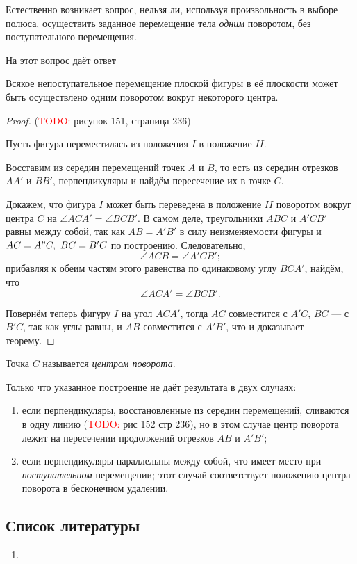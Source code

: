 Естественно возникает вопрос, нельзя ли, используя произвольность в выборе
полюса, осуществить заданное перемещение тела \textit{одним} поворотом, без
поступательного перемещения.

На этот вопрос даёт ответ
\begin{theorem}[Эйлера]
  Всякое непоступательное перемещение плоской фигуры в её плоскости может быть
  осуществлено одним поворотом вокруг некоторого центра.
\end{theorem}

\begin{proof}
  (\textcolor{red}{TODO:} рисунок 151, страница 236)

  Пусть фигура переместилась из положения $I$ в положение $II$.

  Восставим из середин перемещений точек $A$ и $B$, то есть из середин отрезков
  $AA'$ и $BB'$, перпендикуляры и найдём пересечение их в точке $C$.

  Докажем, что фигура $I$ может быть переведена в положение $II$ поворотом
  вокруг центра $C$ на $\angle ACA' = \angle BCB'$. В самом деле, треугольники
  $ABC$ и $A'CB'$ равны между собой, так как $AB = A'B'$ в силу неизменяемости
  фигуры и $AC = A"C,~BC = B'C$ по построению. Следовательно,
  \begin{equation*}
    \angle ACB = \angle A'CB';
  \end{equation*}
  прибавляя к обеим частям этого равенства по одинаковому углу $BCA'$, найдём,
  что
  \begin{equation*}
    \angle ACA' = \angle BCB'.
  \end{equation*}

  Повернём теперь фигуру $I$ на угол $ACA'$, тогда $AC$ совместится с $A'C$,
  $BC$ --- с $B'C$, так как углы равны, и $AB$ совместится с $A'B'$, что и
  доказывает теорему.
\end{proof}

\begin{definition}
  Точка $C$ называется \textit{центром поворота}.
\end{definition}

\begin{remark}
  Только что указанное построение не даёт результата в двух случаях:
  \begin{enumerate}
    \item если перпендикуляры, восстановленные из середин перемещений, сливаются
      в одну линию (\textcolor{red}{TODO:} рис 152 стр 236), но в этом случае
      центр поворота лежит на пересечении продолжений отрезков $AB$ и $A'B'$;

    \item если перпендикуляры параллельны между собой, что имеет место при
      \textit{поступательном} перемещении; этот случай соответствует положению
      центра поворота в бесконечном удалении.
  \end{enumerate}
\end{remark}

\subsection{Список литературы}
\begin{enumerate}
  \item \cite{lourie}
\end{enumerate}

